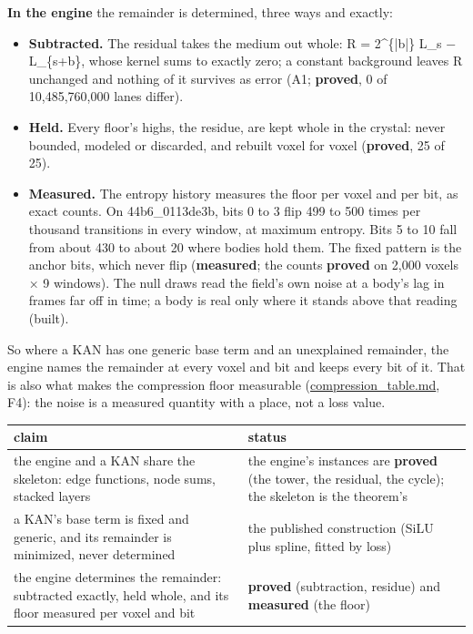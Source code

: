 \textbf{In the engine} the remainder is determined, three ways and exactly:

\begin{itemize}
\item \textbf{Subtracted.} The residual takes the medium out whole: R = 2\textasciicircum{}\{|b|\} L\_\allowbreak{}s − L\_\allowbreak{}\{s+b\}, whose kernel sums to exactly zero; a constant background leaves R unchanged and nothing of it survives as error (A1; \textbf{proved}, 0 of 10,485,760,000 lanes differ).
\item \textbf{Held.} Every floor's highs, the residue, are kept whole in the crystal: never bounded, modeled or discarded, and rebuilt voxel for voxel (\textbf{proved}, 25 of 25).
\item \textbf{Measured.} The entropy history measures the floor per voxel and per bit, as exact counts. On 44b6\_\allowbreak{}0113de3b, bits 0 to 3 flip 499 to 500 times per thousand transitions in every window, at maximum entropy. Bits 5 to 10 fall from about 430 to about 20 where bodies hold them. The fixed pattern is the anchor bits, which never flip (\textbf{measured}; the counts \textbf{proved} on 2,000 voxels × 9 windows). The null draws read the field's own noise at a body's lag in frames far off in time; a body is real only where it stands above that reading (built).
\end{itemize}

So where a KAN has one generic base term and an unexplained remainder, the engine names the remainder at every voxel and bit and keeps every bit of it. That is also what makes the compression floor measurable (\hyperref[chap:compression-table]{compression\_\allowbreak{}table.md}, F4): the noise is a measured quantity with a place, not a loss value.

{\small
\setlength{\tabcolsep}{6pt}
\begin{longtable}{>{\RaggedRight\arraybackslash}p{}>{\RaggedRight\arraybackslash}p{}}
\toprule
claim & status \\
\midrule
\endhead
the engine and a KAN share the skeleton: edge functions, node sums, stacked layers & the engine's instances are \textbf{proved} (the tower, the residual, the cycle); the skeleton is the theorem's \\
a KAN's base term is fixed and generic, and its remainder is minimized, never determined & the published construction (SiLU plus spline, fitted by loss) \\
the engine determines the remainder: subtracted exactly, held whole, and its floor measured per voxel and bit & \textbf{proved} (subtraction, residue) and \textbf{measured} (the floor) \\
\bottomrule
\end{longtable}
}

